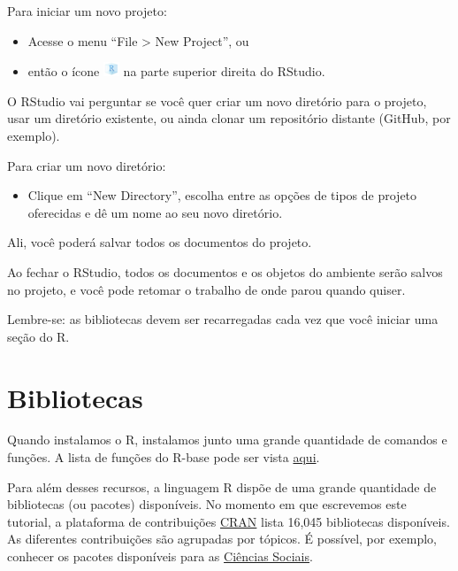 \documentclass[
  10pt,
  brazil,
  a4paper,
  twoside, notitlepage, openright]{book}
\providecommand{\tightlist}{%
  \setlength{\itemsep}{0pt}\setlength{\parskip}{0pt}}
\begin{document}
Para iniciar um novo projeto:

\begin{itemize}
\tightlist
\item
  Acesse o menu ``File \textgreater{} New Project'', ou
\item
  então o ícone \includegraphics{img/proj_ico.png} na parte superior direita do RStudio.
\end{itemize}

O RStudio vai perguntar se você quer criar um novo diretório para o projeto, usar um diretório existente, ou ainda clonar um repositório distante (GitHub, por exemplo).

Para criar um novo diretório:

\begin{itemize}
\tightlist
\item
  Clique em ``New Directory'', escolha entre as opções de tipos de projeto oferecidas e dê um nome ao seu novo diretório.
\end{itemize}

Ali, você poderá salvar todos os documentos do projeto.

Ao fechar o RStudio, todos os documentos e os objetos do ambiente serão salvos no projeto, e você pode retomar o trabalho de onde parou quando quiser.

Lembre-se: as bibliotecas devem ser recarregadas cada vez que você iniciar uma seção do R.

\hypertarget{biblio}{%
\chapter{Bibliotecas}\label{biblio}}

Quando instalamos o R, instalamos junto uma grande quantidade de comandos e funções. A lista de funções do R-base pode ser vista \href{https://stat.ethz.ch/R-manual/R-devel/library/base/html/00Index.html}{aqui}.

Para além desses recursos, a linguagem R dispõe de uma grande quantidade de bibliotecas (ou pacotes) disponíveis. No momento em que escrevemos este tutorial, a plataforma de contribuições \href{https://cran.r-project.org/web/packages/}{CRAN} lista 16,045 bibliotecas disponíveis. As diferentes contribuições são agrupadas por tópicos. É possível, por exemplo, conhecer os pacotes disponíveis para as \href{https://cran.r-project.org/web/views/SocialSciences.html}{Ciências Sociais}.
\end{document}
